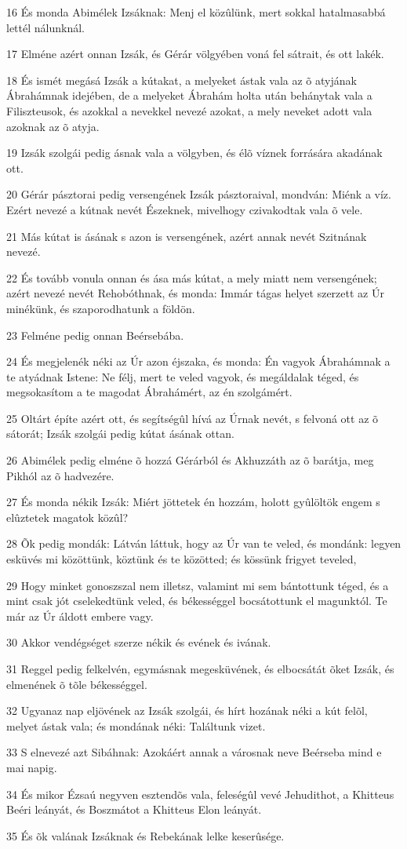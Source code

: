 \par 16 És monda Abimélek Izsáknak: Menj el közûlünk, mert sokkal hatalmasabbá lettél nálunknál.
\par 17 Elméne azért onnan Izsák, és Gérár völgyében voná fel sátrait, és ott lakék.
\par 18 És ismét megásá Izsák a kútakat, a melyeket ástak vala az õ atyjának Ábrahámnak idejében, de a melyeket Ábrahám holta után behánytak vala a Filiszteusok, és azokkal a nevekkel nevezé azokat, a mely neveket adott vala azoknak az õ atyja.
\par 19 Izsák szolgái pedig ásnak vala a völgyben, és élõ víznek forrására akadának ott.
\par 20 Gérár pásztorai pedig versengének Izsák pásztoraival, mondván: Miénk a víz. Ezért nevezé a kútnak nevét Észeknek, mivelhogy czivakodtak vala õ vele.
\par 21 Más kútat is ásának s azon is versengének, azért annak nevét Szitnának nevezé.
\par 22 És tovább vonula onnan és ása más kútat, a mely miatt nem versengének; azért nevezé nevét Rehobóthnak, és monda: Immár tágas helyet szerzett az Úr minékünk, és szaporodhatunk a földön.
\par 23 Felméne pedig onnan Beérsebába.
\par 24 És megjelenék néki az Úr azon éjszaka, és monda: Én vagyok Ábrahámnak a te atyádnak Istene: Ne félj, mert te veled vagyok, és megáldalak téged, és megsokasítom a te magodat Ábrahámért, az én szolgámért.
\par 25 Oltárt építe azért ott, és segítségûl hívá az Úrnak nevét, s felvoná ott az õ sátorát; Izsák szolgái pedig kútat ásának ottan.
\par 26 Abimélek pedig elméne õ hozzá Gérárból és Akhuzzáth az õ barátja, meg Pikhól az õ hadvezére.
\par 27 És monda nékik Izsák: Miért jöttetek én hozzám, holott gyûlöltök engem s elûztetek magatok közûl?
\par 28 Õk pedig mondák: Látván láttuk, hogy az Úr van te veled, és mondánk: legyen esküvés mi közöttünk, köztünk és te közötted; és kössünk frigyet teveled,
\par 29 Hogy minket gonoszszal nem illetsz, valamint mi sem bántottunk téged, és a mint csak jót cselekedtünk veled, és békességgel bocsátottunk el magunktól. Te már az Úr áldott embere vagy.
\par 30 Akkor vendégséget szerze nékik és evének és ivának.
\par 31 Reggel pedig felkelvén, egymásnak megesküvének, és elbocsátát õket Izsák, és elmenének õ tõle békességgel.
\par 32 Ugyanaz nap eljövének az Izsák szolgái, és hírt hozának néki a kút felõl, melyet ástak vala; és mondának néki: Találtunk vizet.
\par 33 S elnevezé azt Sibáhnak: Azokáért annak a városnak neve Beérseba mind e mai napig.
\par 34 És mikor Ézsaú negyven esztendõs vala, feleségûl vevé Jehudithot, a Khitteus Beéri leányát, és Boszmátot a Khitteus Elon leányát.
\par 35 És õk valának Izsáknak és Rebekának lelke keserûsége.

